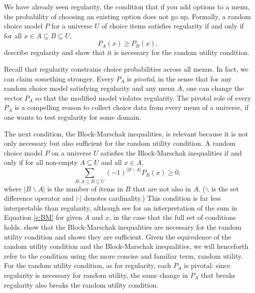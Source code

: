 \documentclass[11pt,letter]{article}
\newcommand{\menu}{menu}
\newcommand{\menus}{menus}
\newcommand{\univ}{U}
\begin{document}
We have already seen regularity, the condition that if you add options to a \menu{}, the probability of choosing an existing option does not go up.
Formally, a random choice model $P$ for a universe $\univ$ of choice items satisfies regularity if and only if for all $x \in A \subseteq B \subseteq \univ$,
\begin{equation}
  P_A(x) \geq P_B(x).
\end{equation}
\citet{LuceSupp65} describe regularity and show that it is necessary for the random utility condition.

Recall that regularity constrains choice probabilities across all \menus{}.
In fact, we can claim something stronger.
Every $P_A$ is {\em pivotal}, in the sense that for any random choice model satisfying regularity and any \menu{} $A$, one can change the vector $P_A$ so that the modified model violates regularity.
The pivotal role of every $P_A$ is a compelling reason to collect choice data from every \menu{} of a universe, if one wants to test regularity for some domain.

The next condition, the Block-Marschak inequalities, is relevant because it is not only necessary but also sufficient for the random utility condition.
A random choice model $P$ on a universe $\univ$ satisfies the Block-Marschak inequalities if and only if for all non-empty $A \subseteq U$ and all $x \in A$,
	\begin{equation}\label{e:BM}
		\sum_{B \colon A \subseteq B \subseteq U} (-1)^{|B \backslash A|} P_B(x) \geq 0,
	\end{equation}
where $|B\backslash A|$ is the number of items in $B$ that are not also in $A$.
($\backslash$ is the set difference operator and $|\cdot|$ denotes cardinality.)
This condition is far less interpretable than regularity, although see \citet[p. 713]{BarbPatt86} for an interpretation of the sum in Equation \eqref{e:BM} for given $A$ and $x$, in the case that the full set of conditions holds.
\citet{BlocMars60} show that the Block-Marschak inequalities are necessary for the random utility condition and \citet{Falm78} shows they are sufficient.
Given the equivalence of the random utility condition and the Block-Marschak inequalities, we will henceforth refer to the condition using the more concise and familiar term, random utility.
For the random utility condition, as for regularity, each $P_A$ is pivotal: since regularity is necessary for random utility, the same change in $P_A$ that breaks regularity also breaks the random utility condition.
\end{document}
